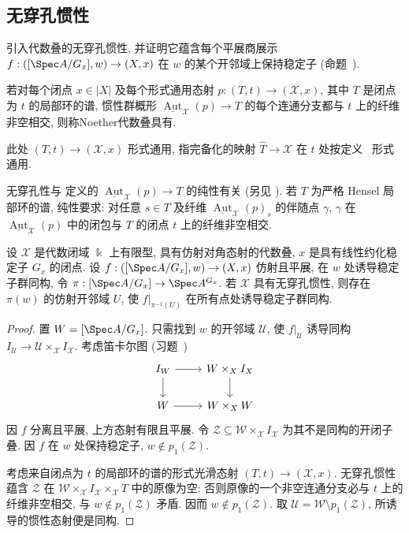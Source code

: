 \subsection{无穿孔惯性}\label{src:7.10.4-subsection}
引入代数叠的无穿孔惯性, 并证明它蕴含每个平展商展示 $f:([\Spec A/G_x],w)\to(\mathcal X,x)$ 在 $w$ 的某个开邻域上保持稳定子 (命题~).
\begin{definition}\label{src:7.10.17}
若对每个闭点 $x\in|X|$ 及每个形式通用态射 $p:(T,t)\to(\mathcal X,x)$, 其中 $T$ 是闭点为 $t$ 的局部环的谱, 惯性群概形 $\underline{\operatorname{Aut}}_{\mathcal X}(p)\to T$ 的每个连通分支都与 $t$ 上的纤维非空相交, 则称Noether代数叠具有.
\end{definition}
\begin{remark}\label{src:7.10.18}
此处 $(T,t)\to(\mathcal X,x)$ 形式通用, 指完备化的映射 $\widehat T\to\mathcal X$ 在 $t$ 处按定义~ 形式通用.
\end{remark}
\begin{remark}\label{src:7.10.19}
无穿孔性与 \cite[第~3.3 节]{GR71} 定义的 $\underline{\operatorname{Aut}}_{\mathcal X}(p)\to T$ 的纯性有关 (另见 \cite[Tag 0CV5]{SP}). 若 $T$ 为严格 Hensel 局部环的谱, 纯性要求: 对任意 $s\in T$ 及纤维 $\underline{\operatorname{Aut}}_{\mathcal X}(p)_s$ 的伴随点 $\gamma$, $\gamma$ 在 $\underline{\operatorname{Aut}}_{\mathcal X}(p)$ 中的闭包与 $T$ 的闭点 $t$ 上的纤维非空相交.
\end{remark}
\begin{proposition}\label{src:7.10.20}
设 $\mathcal X$ 是代数闭域 $\Bbbk$ 上有限型, 具有仿射对角态射的代数叠, $x$ 是具有线性约化稳定子 $G_x$ 的闭点. 设 $f:([\Spec A/G_x],w)\to(\mathcal X,x)$ 仿射且平展, 在 $w$ 处诱导稳定子群同构, 令 $\pi:[\Spec A/G_x]\to\Spec A^{G_x}$. 若 $\mathcal X$ 具有无穿孔惯性, 则存在 $\pi(w)$ 的仿射开邻域 $U$, 使 $f|_{\pi^{-1}(U)}$ 在所有点处诱导稳定子群同构.
\end{proposition}
\begin{proof}
置 $\mathcal W=[\Spec A/G_x]$. 只需找到 $w$ 的开邻域 $\mathcal U$, 使 $f|_{\mathcal U}$ 诱导同构 $I_{\mathcal U}\to\mathcal U\times_{\mathcal X}I_{\mathcal X}$. 考虑笛卡尔图 (习题~)
\[\begin{tikzcd}[ampersand replacement=\&]I_{\mathcal W}\arrow[r]\arrow[d]\&\mathcal W\times_{\mathcal X}I_{\mathcal X}\arrow[d]\\\mathcal W\arrow[r]\&\mathcal W\times_{\mathcal X}\mathcal W\end{tikzcd}\]
因 $f$ 分离且平展, 上方态射有限且平展. 令 $\mathcal Z\subseteq\mathcal W\times_{\mathcal X}I_{\mathcal X}$ 为其不是同构的开闭子叠. 因 $f$ 在 $w$ 处保持稳定子, $w\notin p_1(\mathcal Z)$.

考虑来自闭点为 $t$ 的局部环的谱的形式光滑态射 $(T,t)\to(\mathcal X,x)$. 无穿孔惯性蕴含 $\mathcal Z$ 在 $\mathcal W\times_{\mathcal X}I_{\mathcal X}\times_{\mathcal X}T$ 中的原像为空: 否则原像的一个非空连通分支必与 $t$ 上的纤维非空相交, 与 $w\notin p_1(\mathcal Z)$ 矛盾. 因而 $w\notin\overline{p_1(\mathcal Z)}$. 取 $\mathcal U=\mathcal W\setminus\overline{p_1(\mathcal Z)}$, 所诱导的惯性态射便是同构.
\end{proof}
